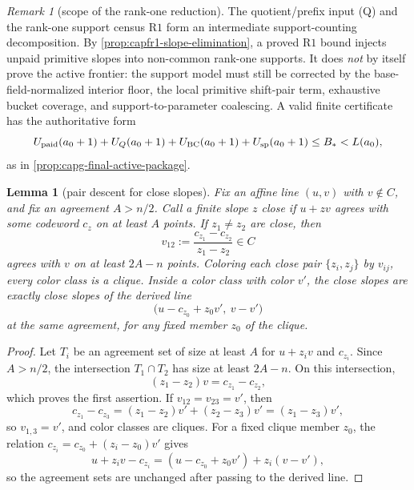 \documentclass[11pt]{article}
\newtheorem{lemma}[lemma]{Lemma}
\theoremstyle{definition}
\theoremstyle{remark}
\newtheorem{remark}[remark]{Remark}
\providecommand{\Rone}{\mathrm{R1}}
\begin{document}
\begin{remark}[scope of the rank-one reduction]\label{cor:capfr1-Q-R1-closing}
The quotient/prefix input \textup{(Q)} and the rank-one support census \(\Rone\) form an intermediate support-counting decomposition.  By \cref{prop:capfr1-slope-elimination}, a proved \(\Rone\) bound injects unpaid primitive slopes into non-common rank-one supports.  It does \emph{not} by itself prove the active frontier: the support model must still be corrected by the base-field-normalized interior floor, the local primitive shift-pair term, exhaustive bucket coverage, and support-to-parameter coalescing.  A valid finite certificate has the authoritative form
\[
        U_{\rm paid}(a_0+1)+U_Q(a_0+1)+U_{\rm BC}(a_0+1)+U_{\rm sp}(a_0+1)
        \le B_*<L(a_0),
\]
as in \cref{prop:capg-final-active-package}.
\end{remark}

\begin{lemma}[pair descent for close slopes]\label{lem:capfr1-pair-descent}
Fix an affine line \((u,v)\) with \(v\notin C\), and fix an agreement \(A>n/2\).  Call a finite slope \(z\) close if \(u+zv\) agrees with some codeword \(c_z\) on at least \(A\) points.  If \(z_1\ne z_2\) are close, then
\[
        v_{12}:=\frac{c_{z_1}-c_{z_2}}{z_1-z_2}\in C
\]
agrees with \(v\) on at least \(2A-n\) points.  Coloring each close pair \(\{z_i,z_j\}\) by \(v_{ij}\), every color class is a clique.  Inside a color class with color \(v'\), the close slopes are exactly close slopes of the derived line
\[
        \bigl(u-c_{z_0}+z_0v',\ v-v'\bigr)
\]
at the same agreement, for any fixed member \(z_0\) of the clique.
\end{lemma}

\begin{proof}
Let \(T_i\) be an agreement set of size at least \(A\) for \(u+z_iv\) and \(c_{z_i}\).  Since \(A>n/2\), the intersection \(T_1\cap T_2\) has size at least \(2A-n\).  On this intersection,
\[
        (z_1-z_2)v=c_{z_1}-c_{z_2},
\]
which proves the first assertion.  If \(v_{12}=v_{23}=v'\), then
\[
        c_{z_1}-c_{z_3}=(z_1-z_2)v'+(z_2-z_3)v'=(z_1-z_3)v',
\]
so \(v_{1,3}=v'\), and color classes are cliques.  For a fixed clique member \(z_0\), the relation \(c_{z_i}=c_{z_0}+(z_i-z_0)v'\) gives
\[
        u+z_iv-c_{z_i}
        =
        (u-c_{z_0}+z_0v')+z_i(v-v'),
\]
so the agreement sets are unchanged after passing to the derived line.
\end{proof}
\end{document}
